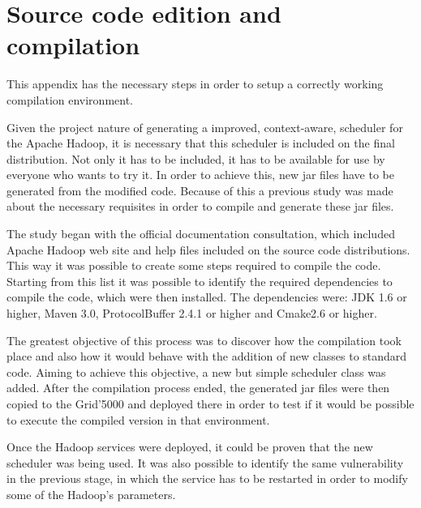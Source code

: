 
\chapter{Source code edition and compilation}
This appendix has the necessary steps in order to setup a correctly working compilation environment.

Given the project nature of generating a improved, context-aware, scheduler for the Apache Hadoop, it is necessary that this scheduler is included on the final distribution. Not only it has to be included, it has to be available for use by everyone who wants to try it. In order to achieve this, new jar files have to be generated from the modified code. Because of this a previous study was made about the necessary requisites in order to compile and generate these jar files.

The study began with the official documentation consultation, which included Apache Hadoop web site and help files included on the source code distributions. This way it was possible to create some steps required to compile the code. Starting from this list it was possible to identify the required dependencies to compile the code, which were then installed. The dependencies were: JDK 1.6 or higher, Maven 3.0, ProtocolBuffer 2.4.1 or higher and Cmake2.6 or higher.

The greatest objective of this process was to discover how the compilation took place and also how it would behave with the addition of new classes to standard code. Aiming to achieve this objective, a new but simple scheduler class was added. After the compilation process ended, the generated jar files were then copied to the Grid'5000 and deployed there in order to test if it would be possible to execute the compiled version in that environment.

Once the Hadoop services were deployed, it could be proven that the new scheduler was being used. It was also possible to identify the same vulnerability in the previous stage, in which the service has to be restarted in order to modify some of the Hadoop's parameters. 